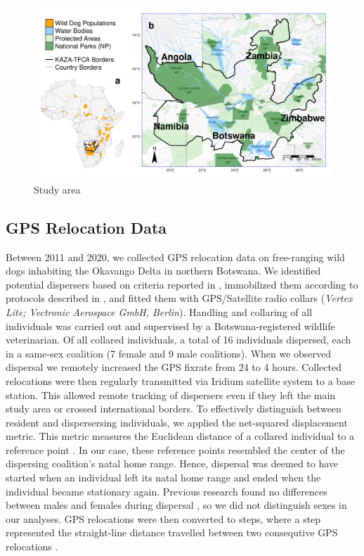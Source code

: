 \documentclass[abstract=on,10pt,a4paper,bibliography=totocnumbered]{article}
\begin{document}
\begin{figure}[htbp]
  \begin{center}
    \includegraphics[width = \textwidth]{99_StudyArea}
    \caption{Study area}
    \label{StudyArea}
  \end{center}
\end{figure}

\subsection{GPS Relocation Data}
Between 2011 and 2020, we collected GPS relocation data on free-ranging wild
dogs inhabiting the Okavango Delta in northern Botswana. We identified potential
dispersers based on criteria reported in \cite{Behr.2020}, immobilized them
according to protocols described in \cite{Osofsky.1996}, and fitted them with
GPS/Satellite radio collars (\textit{Vertex Lite; Vectronic Aerospace GmbH,
Berlin}). Handling and collaring of all individuals was carried out and
supervised by a Botswana-registered wildlife veterinarian. Of all collared
individuals, a total of 16 individuals dispersed, each in a same-sex coalition
(7 female and 9 male coalitions). When we observed dispersal we remotely
increased the GPS fixrate from 24 to 4 hours. Collected relocations were then
regularly transmitted via Iridium satellite system to a base station. This
allowed remote tracking of dispersers even if they left the main study area or
crossed international borders. To effectively distinguish between resident and
dispersersing individuals, we applied the net-squared displacement metric. This
metric measures the Euclidean distance of a collared individual to a reference
point \citep{Borger.2012}. In our case, these reference points resembled the
center of the dispersing coalition's natal home range. Hence, dispersal was
deemed to have started when an individual left its natal home range and ended
when the individual became stationary again. Previous research found no
differences between males and females during dispersal \citep{Woodroffe.2019,
Cozzi.2020}, so we did not distinguish sexes in our analyses. GPS relocations
were then converted to steps, where a step represented the straight-line
distance travelled between two consequtive GPS relocations
\citep{Turching.1998}.
\end{document}
